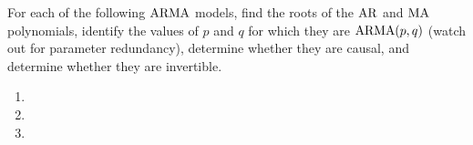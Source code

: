 For each of the following $\operatorname{ARMA}$ models, find the roots of the $\operatorname{AR}$ and $\operatorname{MA}$ polynomials,
identify the values of $p$ and $q$ for which they are $\operatorname{ARMA}(p,q)$ (watch out for parameter
redundancy), determine whether they are causal, and determine whether they are invertible.

\begin{enumerate}[label=(\alph*)]
    \item 
    \item 
    \item 
\end{enumerate}
